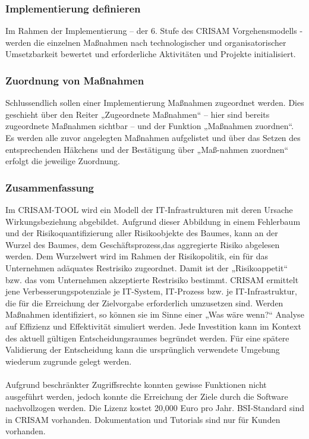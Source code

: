 \subsubsection{Implementierung definieren}
Im Rahmen der Implementierung – der 6. Stufe des CRISAM Vorgehensmodells - werden die einzelnen Maßnahmen nach technologischer und organisatorischer Umsetzbarkeit bewertet und erforderliche Aktivitäten und Projekte initialisiert.
\subsubsection{Zuordnung von Maßnahmen}
Schlussendlich sollen einer Implementierung Maßnahmen zugeordnet werden. Dies geschieht über den Reiter „Zugeordnete Maßnahmen“ – hier sind bereits zugeordnete Maßnahmen sichtbar – und der Funktion „Maßnahmen zuordnen“. Es werden alle zuvor angelegten Maßnahmen aufgelistet und über das Setzen des entsprechenden Häkchens und der Bestätigung über „Maß-nahmen zuordnen“ erfolgt die jeweilige Zuordnung.
\subsubsection{Zusammenfassung}
Im CRISAM-TOOL wird ein Modell der IT-Infrastrukturen mit deren Ursache Wirkungsbeziehung abgebildet. Aufgrund dieser Abbildung in einem Fehlerbaum und der Risikoquantifizierung aller Risikoobjekte des Baumes, kann an der Wurzel des Baumes, dem Geschäftsprozess,das aggregierte Risiko abgelesen werden. Dem Wurzelwert wird im Rahmen der Risikopolitik, ein für das Unternehmen adäquates Restrisiko zugeordnet. Damit ist der „Risikoappetit“ bzw. das vom Unternehmen akzeptierte Restrisiko bestimmt.
CRISAM ermittelt jene Verbesserungspotenziale je IT-System, IT-Prozess bzw. je IT-Infrastruktur,
die für die Erreichung der Zielvorgabe erforderlich umzusetzen sind.
Werden Maßnahmen identifiziert, so können sie im Sinne einer „Was wäre wenn?“ Analyse auf Effizienz und Effektivität simuliert werden. Jede Investition kann im Kontext des aktuell gültigen Entscheidungsraumes begründet werden. Für eine spätere Validierung der Entscheidung kann die ursprünglich verwendete Umgebung wiederum zugrunde gelegt werden.
\\
\\
Aufgrund beschränkter Zugriffsrechte konnten gewisse Funktionen nicht ausgeführt werden, jedoch konnte die Erreichung der Ziele durch die Software nachvollzogen werden.
Die Lizenz kostet 20,000 Euro pro Jahr. BSI-Standard sind in CRISAM vorhanden. Dokumentation und Tutorials sind nur für Kunden vorhanden. 

